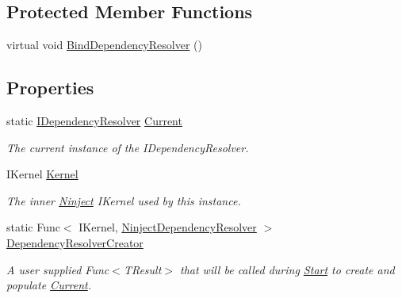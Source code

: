 \subsection*{Protected Member Functions}
\begin{DoxyCompactItemize}
\item 
virtual void \hyperlink{classCqrs_1_1Ninject_1_1Configuration_1_1NinjectDependencyResolver_a2b663d936fcded5f679623bf0b0393e6_a2b663d936fcded5f679623bf0b0393e6}{Bind\+Dependency\+Resolver} ()
\end{DoxyCompactItemize}
\subsection*{Properties}
\begin{DoxyCompactItemize}
\item 
static \hyperlink{interfaceCqrs_1_1Configuration_1_1IDependencyResolver}{I\+Dependency\+Resolver} \hyperlink{classCqrs_1_1Ninject_1_1Configuration_1_1NinjectDependencyResolver_a2a8ebdf55ecac9eccccc237d422a3f31_a2a8ebdf55ecac9eccccc237d422a3f31}{Current}
\begin{DoxyCompactList}\small\item\em The current instance of the I\+Dependency\+Resolver. \end{DoxyCompactList}\item 
I\+Kernel \hyperlink{classCqrs_1_1Ninject_1_1Configuration_1_1NinjectDependencyResolver_a507ba37916f7e77cd5bbcc14543c03b5_a507ba37916f7e77cd5bbcc14543c03b5}{Kernel}
\begin{DoxyCompactList}\small\item\em The inner \hyperlink{namespaceCqrs_1_1Ninject}{Ninject} I\+Kernel used by this instance. \end{DoxyCompactList}\item 
static Func$<$ I\+Kernel, \hyperlink{classCqrs_1_1Ninject_1_1Configuration_1_1NinjectDependencyResolver}{Ninject\+Dependency\+Resolver} $>$ \hyperlink{classCqrs_1_1Ninject_1_1Configuration_1_1NinjectDependencyResolver_a11ea52beeb7420d21c99baeb3501aa0a_a11ea52beeb7420d21c99baeb3501aa0a}{Dependency\+Resolver\+Creator}
\begin{DoxyCompactList}\small\item\em A user supplied Func$<$\+T\+Result$>$ that will be called during \hyperlink{classCqrs_1_1Ninject_1_1Configuration_1_1NinjectDependencyResolver_adc6171ed45679dcbaa67782770ba5083_adc6171ed45679dcbaa67782770ba5083}{Start} to create and populate \hyperlink{classCqrs_1_1Ninject_1_1Configuration_1_1NinjectDependencyResolver_a2a8ebdf55ecac9eccccc237d422a3f31_a2a8ebdf55ecac9eccccc237d422a3f31}{Current}. \end{DoxyCompactList}\end{DoxyCompactItemize}


